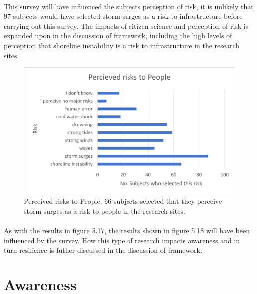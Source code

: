 \paragraph{}
This survey will have influenced the subjects perception of risk, it is unlikely that 97 subjects would have selected storm surges as a risk to infrastructure before carrying out this survey. The impacts of citizen science and perception of risk is expanded upon in the discussion of framework, including the high levels of perception that shoreline instability is a risk to infrastructure in the research sites.


\begin{figure}[h!]
    \centering
    \includegraphics{fig_results/people-risks.png}
    \caption{Perceived risks to People. 66 subjects selected that they perceive storm surges as a risk to people in the research sites. }
    \label{fig:my_label}
\end{figure}
\paragraph{}

As with the results in figure 5.17, the results shown in figure 5.18 will have been influenced by the survey. How this type of research impacts awareness and in turn resilience is futher discussed in the discussion of framework. 


\section{Awareness}

